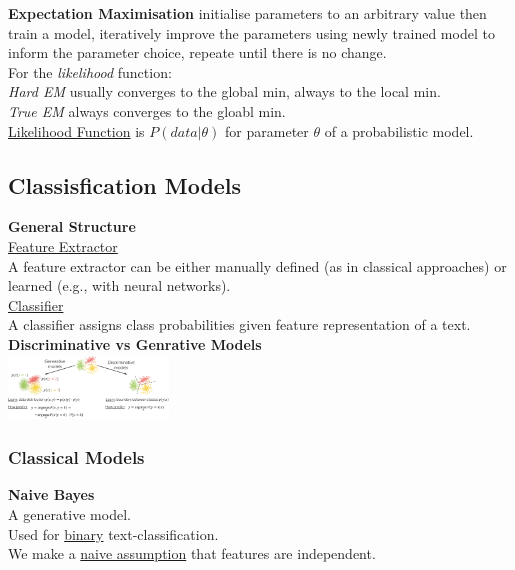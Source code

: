 \documentclass[8pt]{extarticle} %
\begin{document}
\begin{multicols*}{3}
\textbf{Expectation Maximisation} 
initialise parameters to an arbitrary value then train a model,
iteratively improve the parameters using newly trained model to 
inform the parameter choice, repeate until there is no change. \\
For the \textit{likelihood} function:\\
\textit{Hard EM} usually converges to the global min, always to the local min. \\
\textit{True EM} always converges to the gloabl min. \\

\underline{Likelihood Function} is $P(data|\theta)$ for parameter $\theta$ of a probabilistic model.

\subsection*{Classisfication Models}
\textbf{General Structure}\\

\underline{Feature Extractor}\\
A feature extractor can be either manually defined (as in classical approaches) or learned (e.g., with neural networks).\\

\underline{Classifier}\\
A classifier assigns class probabilities given feature representation of a text. \\

\textbf{Discriminative vs Genrative Models}\\
\includegraphics*[width=0.32\textwidth]{media/models.png}

\subsubsection*{Classical Models}
\textbf{Naive Bayes} \\

A generative model. \\

Used for \underline{binary} text-classification. \\

We make a \underline{naive assumption} that features are independent. \\


\end{multicols*}
\end{document}
